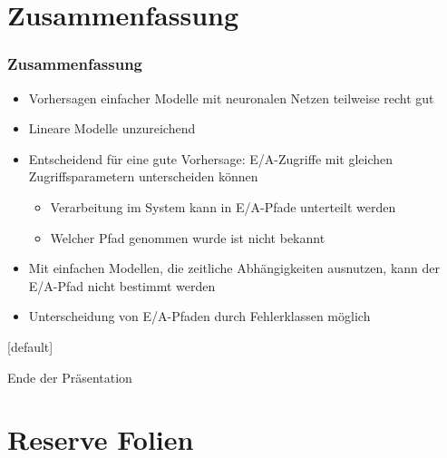 \documentclass{beamer}
\makeatletter
\newenvironment{withoutheadline}{
	\setbeamertemplate{headline}[default]
	\def\beamer@entrycode{\vspace*{-\headheight}}
}{}
\makeatother
\begin{document}
\section{Zusammenfassung}
\begin{frame}
\frametitle{Zusammenfassung}
\begin{itemize}
	\item Vorhersagen einfacher Modelle mit neuronalen Netzen teilweise recht gut 
	\item Lineare Modelle unzureichend
	\item Entscheidend für eine gute Vorhersage: E/A-Zugriffe mit gleichen Zugriffsparametern unterscheiden können
	\begin{itemize}
		\item Verarbeitung im System kann in E/A-Pfade unterteilt werden
		\item Welcher Pfad genommen wurde ist nicht bekannt
	\end{itemize}
	\item Mit einfachen Modellen, die zeitliche Abhängigkeiten ausnutzen, kann der E/A-Pfad nicht bestimmt werden
	\item Unterscheidung von E/A-Pfaden durch Fehlerklassen möglich
\end{itemize}	
\end{frame}
\begin{withoutheadline}
	\begin{frame}
		\Huge{\centerline{Ende der Präsentation}}
	\end{frame}
\end{withoutheadline}

\section*{Reserve Folien}
\end{document}
